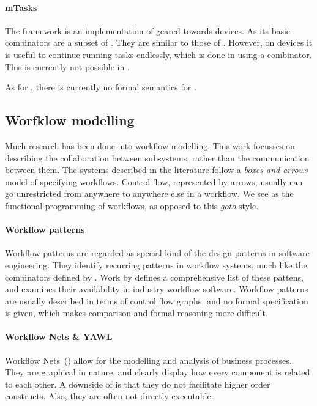 \paragraph{mTasks}

The \MTASKS framework \cite{koopman2018task} is an implementation of \TOP geared towards \IOT devices.
As \TOPHAT its basic combinators are a subset of \ITASKS.
They are similar to those of \TOPHAT.
However, on \IOT devices it is useful to continue running tasks endlessly,
which is done in \MTASKS using a  combinator.
This is currently not possible in \TOPHAT.

As for \ITASKS, there is currently no formal semantics for \MTASKS.



\subsection{Worfklow modelling}

Much research has been done into workflow modelling.
This work focusses on describing the collaboration between subsystems,
rather than the communication between them.
The systems described in the literature follow a \emph{boxes and arrows} model of specifying workflows.
Control flow, represented by arrows, usually can go unrestricted from anywhere to anywhere else in a workflow.
We see \TOP as the functional programming of workflows, as opposed to this \emph{goto}-style.

\paragraph{Workflow patterns}

Workflow patterns are regarded as special kind of the design patterns in
software engineering. They identify recurring patterns in workflow systems, much
like the combinators defined by \TOPHAT. Work by \citet{journals/dpd/AalstHKB03}
defines a comprehensive list of these
pattens, and examines their availability in industry workflow software.
Workflow patterns are usually described in terms of control flow graphs, and no
formal specification is given, which makes comparison and formal reasoning more
difficult.

\paragraph{Workflow Nets \& YAWL}

Workflow Nets~(\WFN) \cite{journals/jcsc/Aalst98} allow for the modelling and analysis of business processes.
They are graphical in nature, and clearly display how every component is related to each other.
A downside of \WFN is that they do not facilitate higher order constructs.
Also, they are often not directly executable.

